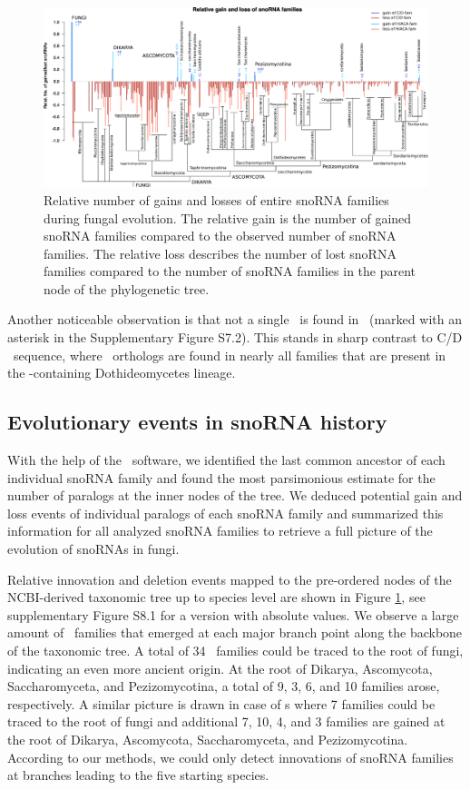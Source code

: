 \begin{figure}
  \centering
  \includegraphics[width=\textwidth]{pics/fungi_relative_gain_loss_PAPERVERSION.eps}
  \caption{Relative number of gains and losses of entire snoRNA
    families during fungal evolution. The relative gain is the number
    of gained snoRNA families compared to the observed number of
    snoRNA families. The relative loss describes the number of lost
    snoRNA families compared to the number of snoRNA families in the
    parent node of the phylogenetic tree.}
\label{fig:relative_innovation_deletion_event}
\end{figure}

Another noticeable observation is that not a single \haca\ is found in
\Ptt\ (marked with an asterisk in the Supplementary Figure S7.2). This
stands in sharp contrast to C/D \sno\ sequence, where \ptt\ orthologs
are found in nearly all families that are present in the
\ptt-containing Dothideomycetes lineage.

\subsection{Evolutionary events in snoRNA history}

With the help of the \epope\ software, we identified the last common
ancestor of each individual snoRNA family and found the most
parsimonious estimate for the number of paralogs at the inner nodes of
the tree.  We deduced potential gain and loss events of individual paralogs of
each snoRNA family and summarized this information for all analyzed
snoRNA families to retrieve a full picture of the evolution of snoRNAs
in fungi.

Relative innovation and deletion events mapped to the pre-ordered
nodes of the NCBI-derived taxonomic tree up to species level are shown
in Figure \ref{fig:relative_innovation_deletion_event}, see
supplementary Figure S8.1 for a version with absolute values.  We
observe a large amount of \sno\ families that emerged at each major
branch point along the backbone of the taxonomic tree. A total of 34
\cd\ families could be traced to the root of fungi, indicating an even
more ancient origin. At the root of Dikarya, Ascomycota,
Saccharomyceta, and Pezizomycotina, a total of 9, 3, 6, and 10
families arose, respectively. A similar picture is drawn in case of
\haca s where 7 families could be traced to the root of fungi and
additional 7, 10, 4, and 3 families are gained at the root of Dikarya,
Ascomycota, Saccharomyceta, and Pezizomycotina.  According to our
methods, we could only detect innovations of snoRNA families at
branches leading to the five starting species.

